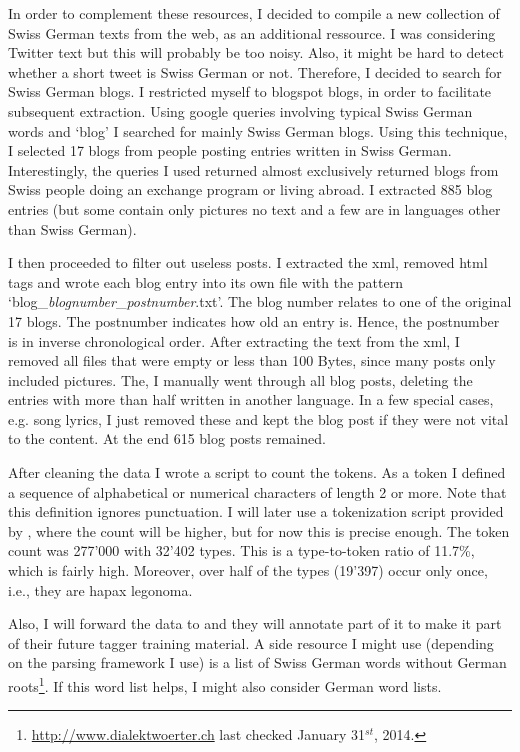 \documentclass[11pt,letterpaper, covington]{article}
\begin{document}
In order to complement these resources, I decided to compile a new collection of Swiss German texts from the web, as an additional ressource. I was considering Twitter text but this will probably be too noisy. Also, it might be hard to detect whether a short tweet is Swiss German or not. Therefore, I decided to search for Swiss German blogs. I restricted myself to blogspot blogs, in order to facilitate subsequent extraction. Using google queries involving typical Swiss German words and `blog' I searched for mainly Swiss German blogs. Using this technique, I selected 17 blogs from people posting entries written in Swiss German. Interestingly, the queries I used returned almost exclusively returned blogs from Swiss people doing an exchange program or living abroad. I extracted 885 blog entries (but some contain only pictures no text and a few are in languages other than Swiss German). 

I then proceeded to filter out useless posts. I extracted the xml, removed html tags and wrote each blog entry into its own file with the pattern `blog\_\emph{blognumber}\_\emph{postnumber}.txt'. The blog number relates to one of the original 17 blogs. The postnumber indicates how old an entry is. Hence, the postnumber is in inverse chronological order. After extracting the text from the xml, I removed all files that were empty or less than 100 Bytes, since many posts only included pictures. The, I manually went through all blog posts, deleting the entries with more than half written in another language. In a few special cases, e.g. song lyrics, I just removed these and kept the blog post if they were not vital to the content. At the end 615 blog posts remained.

After cleaning the data I wrote a script to count the tokens. As a token I defined a sequence of alphabetical or numerical characters of length 2 or more. Note that this definition ignores punctuation. I will later use a tokenization script provided by \citet{AH14}, where the count will be higher, but for now this is precise enough. The token count was 277'000 with 32'402 types. This is a type-to-token ratio of 11.7\%, which is fairly high. Moreover, over half of the types (19'397) occur only once, i.e., they are hapax legonoma.

Also, I will forward the data to \citet{AH14} and they will annotate part of it to make it part of their future tagger training material. A side resource I might use (depending on the parsing framework I use) is a list of Swiss German words without German roots\footnote{\url{http://www.dialektwoerter.ch} last checked January 31$^{st}$, 2014.}. If this word list helps, I might also consider German word lists.
\end{document}
